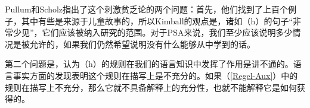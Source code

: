 
Pullum和Scholz指出了这个刺激贫乏论的两个问题：首先，他们找到了上百个例子，其中有些是来源于儿童故事的，所以Kimball的观点是，诸如（h）的句子“非常少见”，它们应该被纳入研究的范围。对于PSA来说，我们至少应该说明多少情况是被允许的，如果我们仍然希望说明没有什么能够从中学到的话\citep[]{PS2002a}。

  第二个问题是，认为（h）的规则在我们的语言知识中发挥了作用是讲不通的。语言事实方面的发现表明这个规则在描写上是不充分的。如果（\ref{Regel-Aux}）中的规则在描写上不充分，那么它就不具备解释上的充分性，也就不能解释它是如何获得的。

